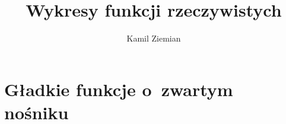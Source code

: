 \documentclass[a4paper,11pt]{article}
\title{Wykresy funkcji rzeczywistych}
\author{Kamil Ziemian \\
  \email}
\numberwithin{equation}{section}
\begin{document}





\maketitle





\section{Gładkie funkcje o~zwartym nośniku}

\label{sec:Funkcje-wykladnicze-i-logarytmiczne}
\end{document}
